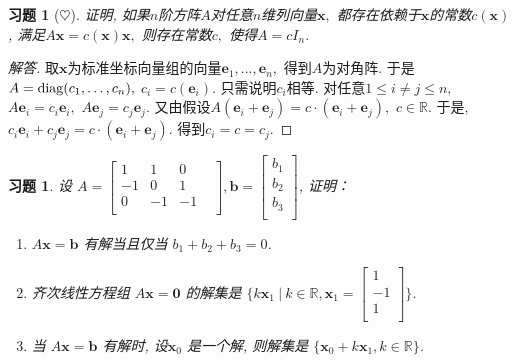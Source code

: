 \documentclass[UTF8]{ctexart}
\newcommand\bs[1]{\boldsymbol{ #1}}
\newtheorem{ex}[thm]{习题}
\begin{document}
\begin{ex}[$\heartsuit $]
证明, 如果$n$阶方阵$A$对任意$n$维列向量$\bs x,$ 都存在依赖于$\bs x$的常数$c(\bs x)$, 满足$A \bs x = c(\bs x) \bs x,$ 则存在常数$c,$ 使得$A = cI_n.$
\end{ex}
\begin{proof}[解答]
取$\bs x$为标准坐标向量组的向量$\bs e_1,\ldots ,\bs e_n,$ 得到$A$为对角阵. 于是$A = {\rm diag}(c_1,\ldots, c_n),$ $c_i = c(\bs e_i).$ 只需说明$c_i$相等.
对任意$1\leq i\neq j \leq n,$ $A \bs e_i = c_i \bs e_i,$ $A \bs e_j = c_j \bs e_j.$ 又由假设$A (\bs e_i + \bs e_j) = c \cdot (\bs e_i + \bs e_j), $ $c\in \mathbb{R}.$ 于是, $c_i \bs e_i+  c_j \bs e_j = c \cdot (\bs e_i + \bs e_j).$ 得到$c_i = c= c_j .$
\end{proof}





\begin{ex}
设 $A=\begin{bmatrix} 1 & 1 & 0 & \\ -1 & 0 & 1 \\ 0 & -1 & -1 \\ \end{bmatrix}, \bs b=\begin{bmatrix} b_1 \\ b_2 \\ b_3 \\ \end{bmatrix}$, 证明：
\begin{enumerate}
\item  $A \bs x=\bs b$ 有解当且仅当 $b_1+b_2+b_3=0$.
\item 齐次线性方程组 $A \bs x=\bm{0}$ 的解集是 $\{k \bs x_1~|~ k \in \mathbb{R}, \bs x_1=\begin{bmatrix} 1 \\ -1 \\ 1 \\ \end{bmatrix}\}$.
\item 当 $A \bs x=\bs b$ 有解时, 设$\bs x_0$ 是一个解, 则解集是 $\{\bs x_0 + k \bs x_1, k \in \mathbb{R}\}$.
\end{enumerate}
\end{ex}
\end{document}
